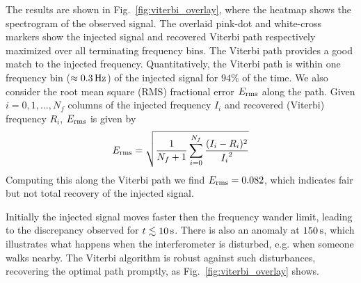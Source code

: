\documentclass[paper-main.tex]{subfiles}
\begin{document}
The results are shown in Fig.~\ref{fig:viterbi_overlay}, where the heatmap shows the spectrogram of the observed signal. 
The overlaid pink-dot and white-cross markers show the injected signal and recovered Viterbi path respectively maximized over all terminating frequency bins. 
The Viterbi path provides a good match to the injected frequency. 
Quantitatively, the Viterbi path is within one frequency bin ($\approx 0.3\,{\rm Hz}$) of the injected signal for $94\%$ of the time. 
We also consider the root mean square (RMS) fractional error $E_{\rm rms}$ along the path. Given $i=0,1,...,N_f$ columns of the injected frequency $I_i$ and recovered (Viterbi) frequency $R_i$, $E_{\rm rms}$ is given by
\begin{equation}
E_{\rm rms} = \sqrt{ \frac{1}{N_f+1} \sum_{i=0}^{N_f} \frac{(I_i - R_i)^2}{{I_i}^2} }
\end{equation}
Computing this along the Viterbi path we find $E_{\rm rms} = 0.082$, which indicates fair but not total recovery of the injected signal.


Initially the injected signal moves faster then the frequency wander limit, leading to the discrepancy observed for $t\lesssim 10\,{\rm s}$. 
There is also an anomaly at $150\,{\rm s}$, which illustrates what happens when the interferometer is disturbed, e.g. when someone walks nearby. 
The Viterbi algorithm is robust against such disturbances, recovering the optimal path promptly, as Fig.~\ref{fig:viterbi_overlay} shows. 

\end{document}
